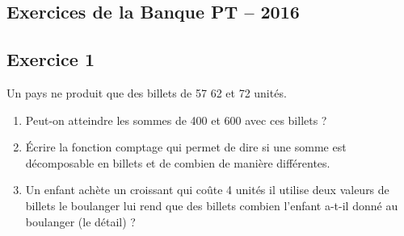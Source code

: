 \documentclass[10pt,fleqn]{article} %
\begin{document}
\newpage 
\begin{multicols}{2}
\section{Exercices de la Banque PT -- 2016}
\subsection*{Exercice 1}

Un pays ne produit que des billets de 57 62 et 72 unités.
\begin{enumerate}
\item Peut-on atteindre les sommes de 400 et 600 avec ces billets ?
\item Écrire la fonction comptage qui permet de dire si une somme est décomposable en billets et de combien de manière différentes. 
\item Un enfant achète un croissant qui coûte 4 unités il utilise deux valeurs de billets le boulanger lui rend que des billets combien l'enfant a-t-il donné au boulanger (le détail) ?
\end{enumerate}

\end{multicols}
\end{document}
